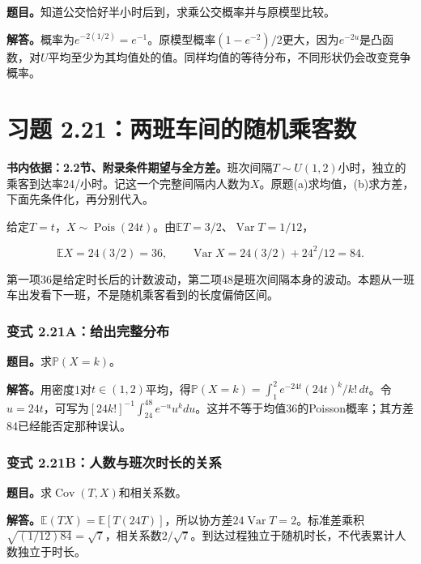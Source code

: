 \documentclass[12pt,a4paper,UTF8,fontset=fandol]{ctexart}
\begin{document}
\textbf{题目。}知道公交恰好半小时后到，求乘公交概率并与原模型比较。

\textbf{解答。}概率为\(e^{-2(1/2)}=e^{-1}\)。原模型概率\((1-e^{-2})/2\)更大，因为\(e^{-2u}\)是凸函数，对\(U\)平均至少为其均值处的值。同样均值的等待分布，不同形状仍会改变竞争概率。

\section{习题
2.21：两班车间的随机乘客数}\label{ux4e60ux9898-2.21ux4e24ux73edux8f66ux95f4ux7684ux968fux673aux4e58ux5ba2ux6570}

\textbf{书内依据：2.2节、附录条件期望与全方差。}班次间隔\(T\sim U(1,2)\)小时，独立的乘客到达率24/小时。记这一个完整间隔内人数为\(X\)。原题(a)求均值，(b)求方差，下面先条件化，再分别代入。

给定\(T=t\)，\(X\sim\operatorname{Pois}(24t)\)。由\(\mathbb ET=3/2\)、\(\operatorname{Var}T=1/12\)，

\[
\boxed{\mathbb EX=24(3/2)=36,\qquad
\operatorname{Var}X=24(3/2)+24^2/12=84.}
\]

第一项36是给定时长后的计数波动，第二项48是班次间隔本身的波动。本题从一班车出发看下一班，不是随机乘客看到的长度偏倚区间。

\subsubsection{变式
2.21A：给出完整分布}\label{ux53d8ux5f0f-2.21aux7ed9ux51faux5b8cux6574ux5206ux5e03}

\textbf{题目。}求\(\mathbb P(X=k)\)。

\textbf{解答。}用密度1对\(t\in(1,2)\)平均，得\(\mathbb P(X=k)=\int_1^2e^{-24t}(24t)^k/k!\,dt\)。令\(u=24t\)，可写为\([24k!]^{-1}\int_{24}^{48}e^{-u}u^kdu\)。这并不等于均值36的Poisson概率；其方差84已经能否定那种误认。

\subsubsection{变式
2.21B：人数与班次时长的关系}\label{ux53d8ux5f0f-2.21bux4ebaux6570ux4e0eux73edux6b21ux65f6ux957fux7684ux5173ux7cfb}

\textbf{题目。}求\(\operatorname{Cov}(T,X)\)和相关系数。

\textbf{解答。}\(\mathbb E(TX)=\mathbb E[T(24T)]\)，所以协方差\(24\operatorname{Var}T=2\)。标准差乘积\(\sqrt{(1/12)84}=\sqrt7\)，相关系数\(2/\sqrt7\)。到达过程独立于随机时长，不代表累计人数独立于时长。
\end{document}
